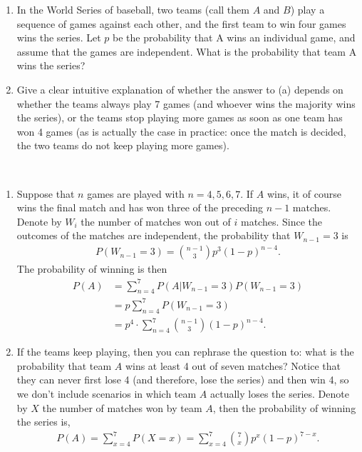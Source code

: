 
\setcounter{theorem}{9}
\begin{exercise}[BH.3.18]
	\begin{enumerate}
		\item In the World Series of baseball, two teams (call them $A$ and $B$) play a sequence of games against each other, and the first team to win four games wins the series. Let $p$ be the probability that A wins an individual game, and assume that the games are independent. What is the probability that team A wins the series?
		\item Give a clear intuitive explanation of whether the answer to (a) depends on whether the teams always play 7 games (and whoever wins the majority wins the series), or the teams stop playing more games as soon as one team has won 4 games (as is actually the case in practice: once the match is decided, the two teams do not keep playing more games).
	\end{enumerate}
\begin{solution}~
	\begin{enumerate}
	    \item Suppose that $n$ games are played with $n = 4,5,6,7$. If $A$ wins, it of course wins the final match and has won three of the preceding $n-1$ matches. Denote by $W_{i}$ the number of matches won out of $i$ matches. Since the outcomes of the matches are independent, the probability that $W_{n-1}=3$ is
        \begin{align*}
        	P(W_{n-1}=3) = {n-1 \choose 3}p^{3}(1-p)^{n-4}.
        \end{align*}
        The probability of winning is then
        \begin{align*}
        	P(A)& =\sum_{n=4}^{7}P(A|W_{n-1}=3)P(W_{n-1}=3)\\
        	&=p\sum_{n=4}^{7}P(W_{n-1}=3)\\
        	&=p^4\cdot \sum_{n=4}^{7}{n-1 \choose 3}(1-p)^{n-4}.
        \end{align*}
        \item If the teams keep playing, then you can rephrase the question to: what is the probability that team $A$ wins at least 4 out of seven matches? Notice that they can never first lose 4 (and therefore, lose the series) and then win 4, so we don't include scenarios in which team $A$ actually loses the series. Denote by $X$ the number of matches won by team $A$, then the probability of winning the series is,
        \begin{align*}
        	P(A) = \sum_{x=4}^{7}P(X=x) = \sum_{x=4}^{7}{7 \choose x}p^{x}(1-p)^{7-x}.
        \end{align*}
	\end{enumerate}
\end{solution}
\end{exercise}


